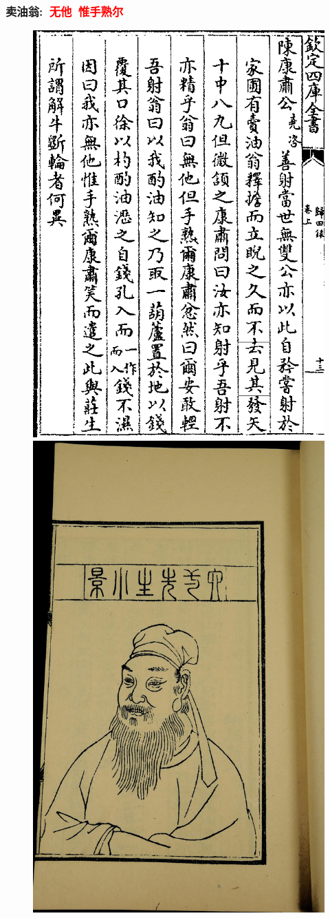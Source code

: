 \frame
{
	\frametitle{卖油翁:~\textcolor{red}{无他~惟手熟尔}}
\begin{figure}[h!]
\centering
\vspace{-10.5pt}
\includegraphics[height=0.65\textwidth]{Figures/Sale_Oil_Ouyang.png}
\hspace{1pt}
\includegraphics[height=0.65\textwidth]{Figures/Ouyang_Xiu-2.jpg}
\caption{\fontsize{6.2pt}{5.2pt}\selectfont{欧阳修(1007-1072)~《欧阳文忠公文集$\cdot$归田录》~卷上}}
\label{Sale_oil}
\end{figure}
}

